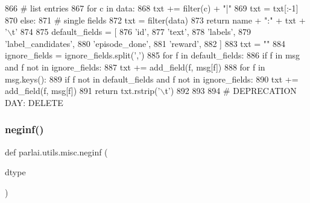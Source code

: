\begin{DoxyCode}
866             \textcolor{comment}{# list entries}
867             \textcolor{keywordflow}{for} c \textcolor{keywordflow}{in} data:
868                 txt += filter(c) + \textcolor{stringliteral}{"|"}
869             txt = txt[:-1]
870         \textcolor{keywordflow}{else}:
871             \textcolor{comment}{# single fields}
872             txt = filter(data)
873         \textcolor{keywordflow}{return} name + \textcolor{stringliteral}{":"} + txt + \textcolor{stringliteral}{'\(\backslash\)t'}
874 
875     default\_fields = [
876         \textcolor{stringliteral}{'id'},
877         \textcolor{stringliteral}{'text'},
878         \textcolor{stringliteral}{'labels'},
879         \textcolor{stringliteral}{'label\_candidates'},
880         \textcolor{stringliteral}{'episode\_done'},
881         \textcolor{stringliteral}{'reward'},
882     ]
883     txt = \textcolor{stringliteral}{""}
884     ignore\_fields = ignore\_fields.split(\textcolor{stringliteral}{','})
885     \textcolor{keywordflow}{for} f \textcolor{keywordflow}{in} default\_fields:
886         \textcolor{keywordflow}{if} f \textcolor{keywordflow}{in} msg \textcolor{keywordflow}{and} f \textcolor{keywordflow}{not} \textcolor{keywordflow}{in} ignore\_fields:
887             txt += add\_field(f, msg[f])
888     \textcolor{keywordflow}{for} f \textcolor{keywordflow}{in} msg.keys():
889         \textcolor{keywordflow}{if} f \textcolor{keywordflow}{not} \textcolor{keywordflow}{in} default\_fields \textcolor{keywordflow}{and} f \textcolor{keywordflow}{not} \textcolor{keywordflow}{in} ignore\_fields:
890             txt += add\_field(f, msg[f])
891     \textcolor{keywordflow}{return} txt.rstrip(\textcolor{stringliteral}{'\(\backslash\)t'})
892 
893 
894 \textcolor{comment}{# DEPRECATION DAY: DELETE}
\end{DoxyCode}
\mbox{\label{namespaceparlai_1_1utils_1_1misc_a68c44ca571de7149b683539db659c330}} 
\subsubsection{\texorpdfstring{neginf()}{neginf()}}
{\footnotesize\ttfamily def parlai.\+utils.\+misc.\+neginf (\begin{DoxyParamCaption}\item[{}]{dtype }\end{DoxyParamCaption})}

